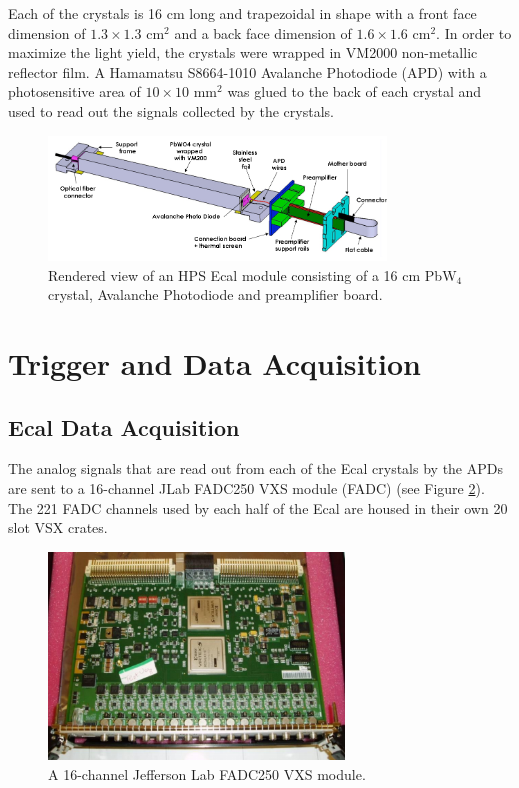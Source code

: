 Each of the crystals is 16 cm long and trapezoidal in shape with a front face
dimension of $1.3 \times 1.3$ cm$^2$ and a back face dimension of $1.6 \times
1.6$ cm$^2$.  In order to maximize the light yield, the crystals were wrapped
in VM2000 non-metallic reflector film. A Hamamatsu S8664-1010 Avalanche 
Photodiode (APD) with a photosensitive area of $10 \times 10$ mm$^2$ was glued
to the back of each crystal and used to read out the signals collected by the
crystals.  
\begin{figure}
    \centering
    \includegraphics[width=0.8\textwidth]{images/ecal_crystal.png}
    \caption{Rendered view of an HPS Ecal module consisting of a 16 cm PbW$_4$
             crystal, Avalanche Photodiode and preamplifier board.}
    \label{fig:ecal_crystal}
\end{figure}

\section{Trigger and Data Acquisition}

\subsection{Ecal Data Acquisition}

The analog signals that are read out from each of the Ecal crystals by the APDs
are sent to a 16-channel JLab FADC250 VXS module (FADC)
(see Figure \ref{fig:ecal_fadc}).  The 221 FADC channels used by each half of 
the Ecal are housed in their own 20 slot VSX crates.
\begin{figure}
    \centering
    \includegraphics[width=0.7\textwidth]{images/ecal_fadc.png}
    \caption{A 16-channel Jefferson Lab FADC250 VXS module.}
    \label{fig:ecal_fadc}
\end{figure}

